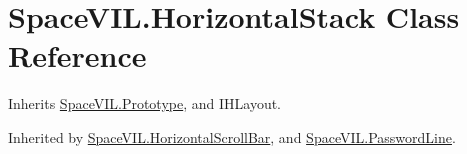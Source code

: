 \hypertarget{class_space_v_i_l_1_1_horizontal_stack}{}\section{Space\+V\+I\+L.\+Horizontal\+Stack Class Reference}
\label{class_space_v_i_l_1_1_horizontal_stack}


Inherits \mbox{\hyperlink{class_space_v_i_l_1_1_prototype}{Space\+V\+I\+L.\+Prototype}}, and I\+H\+Layout.



Inherited by \mbox{\hyperlink{class_space_v_i_l_1_1_horizontal_scroll_bar}{Space\+V\+I\+L.\+Horizontal\+Scroll\+Bar}}, and \mbox{\hyperlink{class_space_v_i_l_1_1_password_line}{Space\+V\+I\+L.\+Password\+Line}}.

